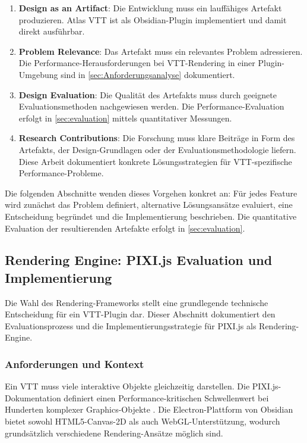 \begin{enumerate}
	\item \textbf{Design as an Artifact}: Die Entwicklung muss ein lauffähiges Artefakt produzieren. Atlas \ac{VTT} ist als Obsidian-Plugin implementiert und damit direkt ausführbar.
	\item \textbf{Problem Relevance}: Das Artefakt muss ein relevantes Problem adressieren. Die Performance-Herausforderungen bei \ac{VTT}-Rendering in einer Plugin-Umgebung sind in \autoref{sec:Anforderungsanalyse} dokumentiert.
	\item \textbf{Design Evaluation}: Die Qualität des Artefakts muss durch geeignete Evaluationsmethoden nachgewiesen werden. Die Performance-Evaluation erfolgt in \autoref{sec:evaluation} mittels quantitativer Messungen.
	\item \textbf{Research Contributions}: Die Forschung muss klare Beiträge in Form des Artefakts, der Design-Grundlagen oder der Evaluationsmethodologie liefern. Diese Arbeit dokumentiert konkrete Lösungsstrategien für \ac{VTT}-spezifische Performance-Probleme.
\end{enumerate}

Die folgenden Abschnitte wenden dieses Vorgehen konkret an: Für jedes Feature wird zunächst das Problem definiert, alternative Lösungsansätze evaluiert, eine Entscheidung begründet und die Implementierung beschrieben. Die quantitative Evaluation der resultierenden Artefakte erfolgt in \autoref{sec:evaluation}.

\subsection{Rendering Engine: PIXI.js Evaluation und Implementierung}
\label{subsec:rendering-engine-pixi}

Die Wahl des Rendering-Frameworks stellt eine grundlegende technische Entscheidung für ein \ac{VTT}-Plugin dar. Dieser Abschnitt dokumentiert den Evaluationsprozess und die Implementierungsstrategie für PIXI.js als Rendering-Engine.

\subsubsection{Anforderungen und Kontext}

Ein \ac{VTT} muss viele interaktive Objekte gleichzeitig darstellen. Die PIXI.js-Dokumentation definiert einen Performance-kritischen Schwellenwert bei Hunderten komplexer Graphics-Objekte \autocite{PixiPerf2024}. Die Electron-Plattform von Obsidian bietet sowohl HTML5-Canvas-2D als auch \ac{WebGL}-Unterstützung, wodurch grundsätzlich verschiedene Rendering-Ansätze möglich sind.

